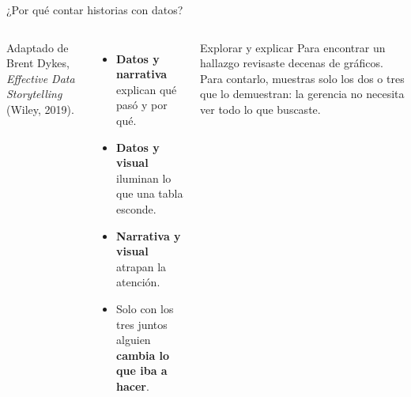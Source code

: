 \documentclass[aspectratio=169,11pt]{beamer}
\begin{document}
\begin{frame}[t]{¿Por qué contar historias con datos?}
  \begin{columns}[T,onlytextwidth]
    \centering

    {\scriptsize\color{black!60}Adaptado de Brent Dykes,
    \emph{Effective Data Storytelling} (Wiley, 2019).}
    \footnotesize
    \begin{itemize}
      \footnotesize
      \item \textbf{Datos y narrativa} explican qué pasó y por qué.
      \item \textbf{Datos y visual} iluminan lo que una tabla esconde.
      \item \textbf{Narrativa y visual} atrapan la atención.
      \item Solo con los tres juntos alguien \textbf{cambia lo que iba a
        hacer}.
    \end{itemize}
    \vspace{0.1cm}
    \begin{block}{Explorar y explicar}
      \footnotesize Para encontrar un hallazgo revisaste decenas de
      gráficos. Para contarlo, muestras solo los dos o tres que lo
      demuestran: la gerencia no necesita ver todo lo que buscaste.
    \end{block}
  \end{columns}
\end{frame}

\end{document}
